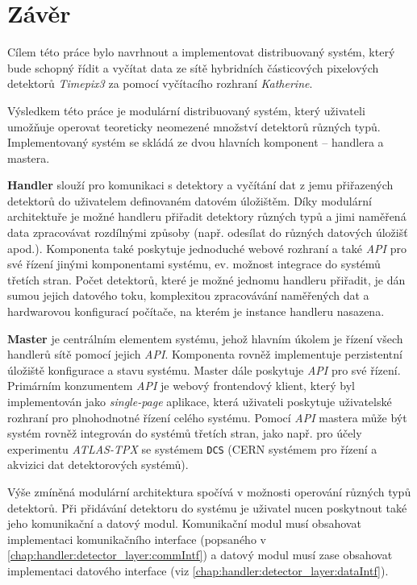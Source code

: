 

\chapter{Závěr}\label{chap:zaver}
Cílem této práce bylo navrhnout a implementovat distribuovaný systém, který bude schopný řídit a vyčítat data ze sítě hybridních částicových pixelových detektorů \textit{Timepix3} za pomocí vyčítacího rozhraní \textit{Katherine}. 

Výsledkem této práce je modulární distribuovaný systém, který uživateli umožňuje operovat teoreticky neomezené množství detektorů různých typů. Implementovaný systém se skládá ze dvou hlavních komponent -- handlera a mastera.

\textbf{Handler} slouží pro komunikaci s detektory a vyčítání dat z jemu přiřazených detektorů do uživatelem definovaném datovém úložištěm. Díky modulární architektuře je možné handleru přiřadit detektory různých typů a jimi naměřená data zpracovávat rozdílnými způsoby (např. odesílat do různých datových úložišť apod.). Komponenta také poskytuje jednoduché webové rozhraní a také \textit{API} pro své řízení jinými komponentami systému, ev. možnost integrace do systémů třetích stran. Počet detektorů, které je možné jednomu handleru přiřadit, je dán sumou jejich datového toku, komplexitou zpracovávání naměřených dat a hardwarovou konfigurací počítače, na kterém je instance handleru nasazena.

\textbf{Master} je centrálním elementem systému, jehož hlavním úkolem je řízení všech handlerů sítě pomocí jejich \textit{API}. Komponenta rovněž implementuje perzistentní úložiště konfigurace a stavu systému. Master dále poskytuje \textit{API} pro své řízení. Primárním konzumentem \textit{API} je webový frontendový klient, který byl implementován jako \textit{single-page} aplikace, která uživateli poskytuje uživatelské rozhraní pro plnohodnotné řízení celého systému. Pomocí \textit{API} mastera může být systém rovněž integrován do systémů třetích stran, jako např. pro účely experimentu \textit{ATLAS-TPX} se systémem \texttt{DCS} (CERN systémem pro řízení a akvizici dat detektorových systémů).

Výše zmíněná modulární architektura spočívá v možnosti operování různých typů detektorů. Při přidávání detektoru do systému je uživatel nucen poskytnout také jeho komunikační a datový modul. Komunikační modul musí obsahovat implementaci komunikačního interface (popsaného v \ref{chap:handler:detector_layer:commIntf}) a datový modul musí zase obsahovat implementaci datového interface (viz \ref{chap:handler:detector_layer:dataIntf}).

